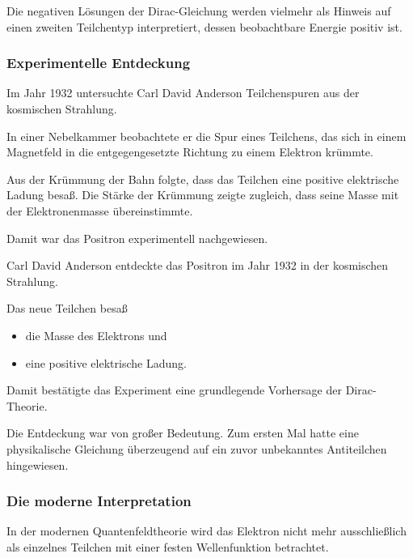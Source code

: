 Die negativen Lösungen der Dirac-Gleichung werden vielmehr als Hinweis
auf einen zweiten Teilchentyp interpretiert, dessen beobachtbare Energie
positiv ist.

\subsubsection*{Experimentelle Entdeckung}

Im Jahr 1932 untersuchte Carl David Anderson%
 Teilchenspuren aus der kosmischen
Strahlung.

In einer Nebelkammer%
 beobachtete er die Spur eines Teilchens, das sich
in einem Magnetfeld in die entgegengesetzte Richtung zu einem Elektron
krümmte.

Aus der Krümmung der Bahn folgte, dass das Teilchen eine positive
elektrische Ladung besaß. Die Stärke der Krümmung zeigte zugleich, dass
seine Masse mit der Elektronenmasse übereinstimmte.

Damit war das Positron experimentell nachgewiesen.

\begin{HistoryBox}
	\label{box:entdeckung_positron}
	
	Carl David Anderson entdeckte das Positron im Jahr 1932 in der
	kosmischen Strahlung.
	
	Das neue Teilchen besaß
	
	\begin{itemize}
		\item die Masse des Elektrons und
		\item eine positive elektrische Ladung.
	\end{itemize}
	
	Damit bestätigte das Experiment eine grundlegende Vorhersage der
	Dirac-Theorie.
\end{HistoryBox}

Die Entdeckung war von großer Bedeutung. Zum ersten Mal hatte eine
physikalische Gleichung überzeugend auf ein zuvor unbekanntes
Antiteilchen hingewiesen.

\subsubsection*{Die moderne Interpretation}

In der modernen Quantenfeldtheorie%
wird das Elektron nicht mehr ausschließlich als einzelnes Teilchen mit
einer festen Wellenfunktion betrachtet.


